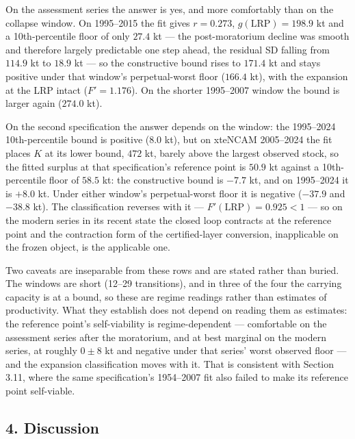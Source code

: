 On the assessment series the answer is yes, and more comfortably than on the
collapse window. On 1995--2015 the fit gives \(r = 0.273\),
\(g(\mathrm{LRP}) = 198.9\) kt and a 10th-percentile floor of only
\(27.4\) kt --- the post-moratorium decline was smooth and therefore largely
predictable one step ahead, the residual SD falling from \(114.9\) kt to
\(18.9\) kt --- so the constructive bound rises to \(171.4\) kt and stays
positive under that window's perpetual-worst floor (\(166.4\) kt), with the
expansion at the LRP intact (\(F' = 1.176\)). On the shorter 1995--2007
window the bound is larger again (\(274.0\) kt).

On the second specification the answer depends on the window: the 1995--2024
10th-percentile bound is positive (\(8.0\) kt), but on xteNCAM 2005--2024 the fit
places \(K\) at its lower bound, \(472\) kt, barely above the largest
observed stock, so the fitted surplus at that specification's reference point
is \(50.9\) kt against a 10th-percentile floor of \(58.5\) kt: the
constructive bound is \(-7.7\) kt, and on 1995--2024 it is \(+8.0\) kt.
Under either window's perpetual-worst floor it is negative (\(-37.9\) and
\(-38.8\) kt). The classification reverses with it ---
\(F'(\mathrm{LRP}) = 0.925 < 1\) --- so on the modern series in its recent
state the closed loop contracts at the reference point and the contraction form
of the certified-layer conversion, inapplicable on the frozen object, is the
applicable one.

Two caveats are inseparable from these rows and are stated rather than buried.
The windows are short (12--29 transitions), and in three of the four the
carrying capacity is at a bound, so these are regime readings rather than
estimates of productivity. What they establish does not depend on reading them
as estimates: the reference point's self-viability is regime-dependent ---
comfortable on the assessment series after the moratorium, and at best marginal
on the modern series, at roughly \(0 \pm 8\) kt and negative under that
series' worst observed floor --- and the expansion classification moves with
it. That is consistent with Section 3.11, where the same specification's
1954--2007 fit also failed to make its reference point self-viable.

\subsection{4. Discussion}\label{budget-discussion}

